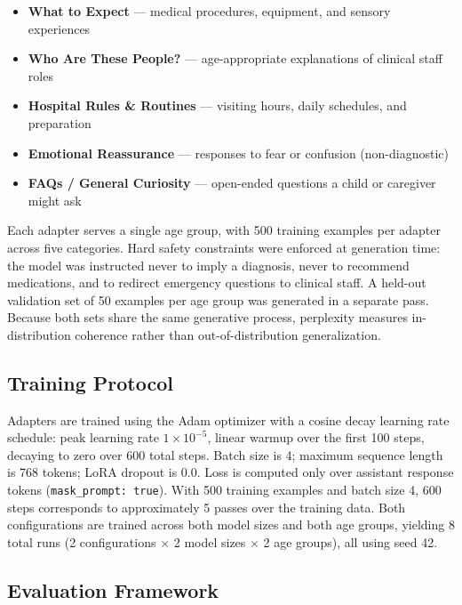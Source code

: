\documentclass[journal]{IEEEtai}
\begin{document}
\begin{itemize}
    \item \textbf{What to Expect} --- medical procedures, equipment, and sensory experiences
    \item \textbf{Who Are These People?} --- age-appropriate explanations of clinical staff roles
    \item \textbf{Hospital Rules \& Routines} --- visiting hours, daily schedules, and preparation
    \item \textbf{Emotional Reassurance} --- responses to fear or confusion (non-diagnostic)
    \item \textbf{FAQs / General Curiosity} --- open-ended questions a child or caregiver might ask
\end{itemize}

Each adapter serves a single age group, with 500 training examples per adapter across five categories. Hard safety constraints were enforced at generation time: the model was instructed never to imply a diagnosis, never to recommend medications, and to redirect emergency questions to clinical staff. A held-out validation set of 50 examples per age group was generated in a separate pass. Because both sets share the same generative process, perplexity measures in-distribution coherence rather than out-of-distribution generalization.

\subsection{Training Protocol}

Adapters are trained using the Adam optimizer with a cosine decay learning rate schedule: peak learning rate $1 \times 10^{-5}$, linear warmup over the first 100 steps, decaying to zero over 600 total steps. Batch size is 4; maximum sequence length is 768 tokens; LoRA dropout is 0.0. Loss is computed only over assistant response tokens (\texttt{mask\_prompt: true}). With 500 training examples and batch size 4, 600 steps corresponds to approximately 5 passes over the training data. Both configurations are trained across both model sizes and both age groups, yielding 8 total runs (2 configurations $\times$ 2 model sizes $\times$ 2 age groups), all using seed 42.

\subsection{Evaluation Framework}
\end{document}
